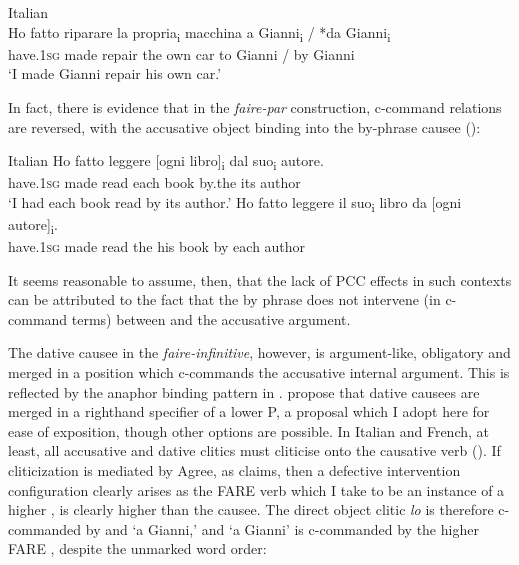 \documentclass[output=paper,colorlinks,citecolor=brown,nonflat]{./langscibook}
\begin{document}
\ea%
    \label{ex:sheehan:20}
    Italian \citep{Burzio1986}\\
    \gll    Ho   fatto   riparare   la   propria\textsubscript{i} macchina  a  Gianni\textsubscript{i} / *da   Gianni\textsubscript{i}\\
            have.\textsc{1sg}   made   repair   the  own   car   to   Gianni /  by   Gianni\\
    \glt    ‘I made Gianni repair his own car.’ 
\z

In fact, there is evidence that in the \textit{faire-par} construction, c-command relations are reversed, with the accusative object binding into the by-phrase causee (\citealt{SheehanCyrino2016}):

\ea%
    \label{ex:sheehan:21}
    Italian \citep[286]{SheehanCyrino2016}
    \ea\label{ex:sheehan:21a}
    \gll    Ho   fatto   leggere [ogni   libro]\textsubscript{i} dal   suo\textsubscript{i}   autore.\\
            have.\textsc{1sg}   made   read   {\db}each book   by.the   its   author\\
    \glt    ‘I had each book read by its author.’
    \ex\label{ex:sheehan:21b}
    \gll    *Ho   fatto   leggere   il  suo\textsubscript{i} libro   da   [ogni  autore]\textsubscript{i}.\\
            have.\textsc{1sg}   made   read   the  his   book   by   {\db}each   author\\
    \z
\z

It seems reasonable to assume, then, that the lack of PCC effects in such contexts can be attributed to the fact that the by phrase does not intervene (in c-command terms) between \liv and the accusative argument. 

The dative causee in the \textit{faire-infinitive}, however, is argument-like, obligatory and merged in a position which c-commands the accusative internal argument. This is reflected by the anaphor binding pattern in . \citet{FolliHarley2007} propose that dative causees are merged in a righthand specifier of a lower \liv P, a proposal which I adopt here for ease of exposition, though other options are possible. In Italian and French, at least, all accusative and dative clitics must cliticise onto the causative verb (\citealt{Kayne1975, Burzio1986, Guasti1993}). If cliticization is mediated by Agree, as \citet{Preminger2019} claims, then a defective intervention configuration clearly arises as the FARE verb which I take to be an instance of a higher \liv , is clearly higher than the causee. The direct object clitic \textit{lo} is therefore c-commanded by \liv and ‘a Gianni,’ and ‘a Gianni’ is c-commanded by the higher FARE \liv , despite the unmarked word order:
\end{document}
